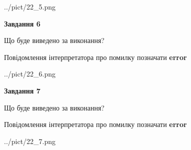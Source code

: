 \documentclass[10pt, ukrainian]{article}
\begin{document}
{\begin {large}
\begin{center}
	{../pict/22_5.png}
\end{center}
\newpage

{\begin {center}\textbf{Завдання 6}\end {center}}\par
Що буде виведено за виконання? \par
Повідомлення інтерпретатора про помилку позначати \textbf{error}

\begin{center}
	{../pict/22_6.png}
\end{center}
\newpage

{\begin {center}\textbf{Завдання 7}\end {center}}\par
Що буде виведено за виконання? \par
Повідомлення інтерпретатора про помилку позначати \textbf{error}

\begin{center}
	{../pict/22_7.png}
\end{center}
\newpage

\end {large}}
\end{document}
